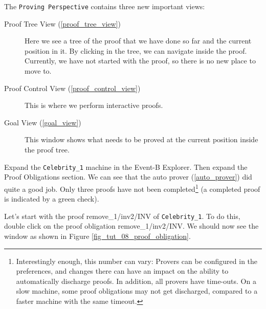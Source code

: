 The \texttt{Proving Perspective} contains three new important views:

\begin{description}
	\item[Proof Tree View (\ref{proof_tree_view})] Here we see a tree of the proof that we have done so far and the current position in it. By clicking in the tree, we can navigate inside the proof. Currently, we have not started with the proof, so there is no new place to move to.
	\item[Proof Control View (\ref{proof_control_view})] This is where we perform interactive proofs.
	\item[Goal View (\ref{goal_view})] This window shows what needs to be proved at the current position inside the proof tree.
\end{description}

Expand the \texttt{Celebrity\_1} machine in the \textsf{Event-B Explorer}. Then expand the \textsf{Proof Obligations} section. We can see that the auto prover (\ref{auto_prover}) did quite a good job. Only three proofs have not been completed\footnote{Interestingly enough, this number can vary: Provers can be configured in the preferences, and changes there can have an impact on the ability to automatically discharge proofs.  In addition, all provers have time-outs.  On a slow machine, some proof obligations may not get discharged, compared to a faster machine with the same timeout.}  (a completed proof is indicated by a green check). 


Let's start with the proof \textsf{remove\_1/inv2/INV} of \texttt{Celebrity\_1}.
To do this, double click on the proof obligation \textsf{remove\_1/inv2/INV}.
We should now see the window as shown in Figure \ref{fig_tut_08_proof_obligation}.


